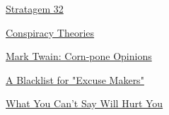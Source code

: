               
              
              
                
              
              
              
                \href{http://coolhaus.de/art-of-controversy/erist32.htm}{Stratagem 32}


              
            
            
              
            
            
              
                
              
              
              
                \href{http://www.cjr.org/politics/those\_loopy\_conspiracy\_theorie.php?page=all}{Conspiracy Theories}


              
              
              
                
              
              
              
                \href{http://www.paulgraham.com/cornpone.html}{Mark Twain: Corn-pone Opinions}


              
            
            
              
            
            
              
                
              
              
              
                \href{http://www.fair.org/index.php?page=2598}{A Blacklist for "Excuse Makers"}


              
              
              
                
              
              
              
                \href{http://www.archub.org/stone.txt}{What You Can't Say Will Hurt You}


              
            
          
